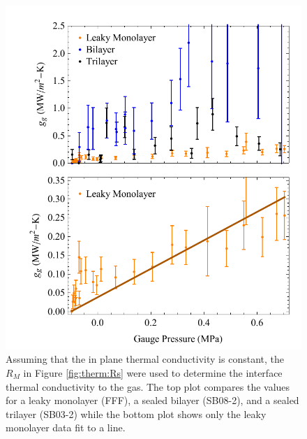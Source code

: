 \begin{figure}
	\begin{center}
	\includegraphics[scale=0.8]{Figs_Thermal/gs.pdf}
	\end{center}
	\caption[Pressure dependent interface thermal conductivity to the gas]{\label{fig:therm:gs}
		Assuming that the in plane thermal conductivity is constant, the $R_M$ in Figure \ref{fig:therm:Rs} were used to determine the interface thermal conductivity to the gas.
		The top plot compares the values for a leaky monolayer (FFF), a sealed bilayer (SB08-2), and a sealed trilayer (SB03-2) while the bottom plot shows only the leaky monolayer data fit to a line.
	}
\end{figure}

